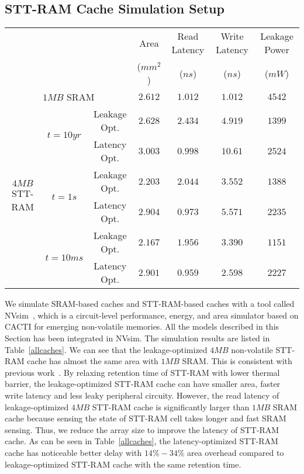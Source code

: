 \subsection{STT-RAM Cache Simulation Setup}

\begin{table*}[t]
  \centering
  \caption{16-way L2 Cache Simulation Results}
  \label{allcaches}
  \begin{tabular}{| c | c | c  | c | c | c | c |}
  	\hline\hline
  	\multirow{2}{*}{} & \multirow{2}{*}{} & \multirow{2}{*}{} & Area  & Read Latency & Write Latency & Leakage Power\\
  & & & ($mm^2$) & ($ns$) & ($ns$) & ($mW$) \\
  	\hline\hline
  	\multicolumn{3}{|c|}{$1MB$ SRAM} & $2.612$ & $1.012$ & $1.012$ & $4542$ \\
  	\hline
  	\multirow{6}{*}{$4MB$ STT-RAM} & \multirow{2}{*}{$t=10yr$} & Leakage Opt.& $2.628$ & $2.434$ & $4.919$ & $1399$ \\
  	\cline{3-3}\cline{4-7}
  	& & Latency Opt. & $3.003$ & $0.998$ & $10.61$ & $2524$ \\
  	\cline{2-3}\cline{4-7}
  	& \multirow{2}{*}{$t=1s$} & Leakage Opt. & $2.203$ & $2.044$ & $3.552$ & $1388$ \\
  	\cline{3-3}\cline{4-7}
  	& & Latency Opt. & $2.904$ & $0.973$ & $5.571$ & $2235$ \\
  	\cline{2-3}\cline{4-7}
  	& \multirow{2}{*}{$t=10ms$} & Leakage Opt. & $2.167$ & $1.956$ & $3.390$ & $1151$ \\
  	\cline{3-3}\cline{4-7}
  	& & Latency Opt. & $2.901$ & $0.959$ & $2.598$ & $2227$ \\	
  	\hline\hline
  \end{tabular}
\end{table*}

We simulate SRAM-based caches and STT-RAM-based caches with a tool called NVsim~\cite{CACTI:PCRAMsim}, which is a circuit-level performance, energy, and area simulator based on CACTI for emerging non-volatile memories. All the models described in this Section has been integrated in NVsim. The simulation results are listed in Table~\ref{allcaches}. We can see that the leakage-optimized $4MB$ non-volatile STT-RAM cache has almost the same area with $1MB$ SRAM. This is consistent with previous work~\cite{CACTI:DAC08:Dong}. By relaxing retention time of STT-RAM with lower thermal barrier, the leakage-optimized STT-RAM cache can have smaller area, faster write latency and less leaky peripheral circuity. However, the read latency of leakage-optimized $4MB$ STT-RAM cache is significantly larger than $1MB$ SRAM cache because sensing the state of STT-RAM cell takes longer and fast SRAM sensing. Thus, we reduce the array size to improve the latency of STT-RAM cache. As can be seen in Table~\ref{allcaches}, the latency-optimized STT-RAM cache has noticeable better delay with $14\%-34\%$ area overhead compared to leakage-optimized STT-RAM cache with the same retention time.

 